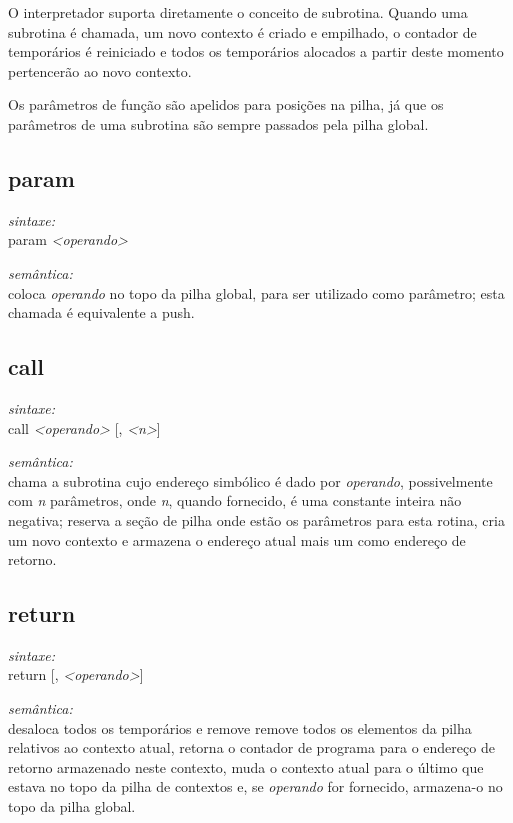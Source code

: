 \documentclass[12pt,a4paper,extrafontsizes,article]{memoir}
\newcommand*{\srcfont}{\fontfamily{pcr}\selectfont}
\begin{document}
O interpretador suporta diretamente o conceito de subrotina. Quando uma subrotina é chamada, um novo contexto é criado e
empilhado, o contador de temporários é reiniciado e todos os temporários alocados a partir deste momento pertencerão ao
novo contexto.

Os parâmetros de função são apelidos para posições na pilha, já que os parâmetros de uma subrotina são sempre passados
pela pilha global.


\subsection{\textbf{param}}

\textit{sintaxe:}\\{\srcfont param \textit{<operando>}}

\noindent \textit{semântica:}\\coloca \textit{operando} no topo da pilha global, para ser utilizado como parâmetro;
esta chamada é equivalente a {\srcfont push}.


\subsection{\textbf{call}}

\textit{sintaxe:}\\{\srcfont call \textit{<operando>} [, \textit{<n>}]}

\noindent \textit{semântica:}\\chama a subrotina cujo endereço simbólico é dado por \textit{operando}, possivelmente com
\textit{n} parâmetros, onde \textit{n}, quando fornecido, é uma constante inteira não negativa; reserva a seção de pilha
onde estão os parâmetros para esta rotina, cria um novo contexto e armazena o endereço atual mais um como endereço de
retorno.


\subsection{\textbf{return}}

\textit{sintaxe:}\\{\srcfont return [, \textit{<operando>}]}

\noindent \textit{semântica:}\\desaloca todos os temporários e remove remove todos os elementos da pilha relativos
ao contexto atual, retorna o contador de programa para o endereço de retorno armazenado neste contexto, muda o contexto
atual para o último que estava no topo da pilha de contextos e, se \textit{operando} for fornecido, armazena-o no topo
da pilha global.
\end{document}
